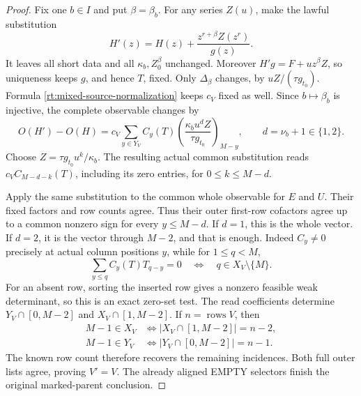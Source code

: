 \documentclass[11pt,a4paper]{amsart}
\numberwithin{equation}{section}
\theoremstyle{plain}
\theoremstyle{definition}
\begin{document}
\begin{proof}
Fix one \(b\in I\) and put \(\beta=\beta_b\).  For any series \(Z(u)\),
make the lawful substitution
\[
 H'(z)=H(z)+\frac{z^{r+\beta}Z(z^r)}{g(z)}.
\]
It leaves all short data and all \(\kappa_b,Z^\beta_0\) unchanged.
Moreover \(H'g=F+uz^\beta Z\), so uniqueness keeps \(g\), and hence
\(T\), fixed.  Only \(\Delta_\beta\) changes, by
\(uZ/(\tau g_{t_0})\).  Formula
\eqref{rt:mixed-source-normalization} keeps \(c_V\) fixed as well.
Since \(b\mapsto\beta_b\) is injective, the complete observable changes
by
\[
 O(H')-O(H)
 =c_V\sum_{y\in Y_V}C_y(T)
       \left(\frac{\kappa_bu^dZ}{\tau g_{t_0}}\right)_{M-y},
 \qquad d=\nu_b+1\in\{1,2\}.
\]
Choose \(Z=\tau g_{t_0}u^k/\kappa_b\).  The resulting actual common
substitution reads \(c_VC_{M-d-k}(T)\), including its zero entries,
for \(0\le k\le M-d\).

Apply the same substitution to the common whole observable for
\(E\) and \(U\).  Their fixed factors and row counts agree.  Thus their
outer first-row cofactors agree up to a common nonzero sign for
every \(y\le M-d\).  If \(d=1\), this is the whole vector.
If \(d=2\), it is the vector through \(M-2\), and that is enough.
Indeed \(C_y\ne0\) precisely at actual column positions \(y\), while
for \(1\le q<M\),
\[
 \sum_{y\le q}C_y(T)T_{q-y}=0
       \quad\Longleftrightarrow\quad q\in X_V\setminus\{M\}.
\]
For an absent row, sorting the inserted row gives a nonzero feasible
weak determinant, so this is an exact zero-set test.  The read
coefficients determine \(Y_V\cap[0,M-2]\) and
\(X_V\cap[1,M-2]\).  If \(n=\operatorname{rows}V\), then
\[
 \begin{split}
 M-1\in X_V&\iff
       |X_V\cap[1,M-2]|=n-2,\\
 M-1\in Y_V&\iff
       |Y_V\cap[0,M-2]|=n-1.
 \end{split}
\]
The known row count therefore recovers the remaining incidences.
Both full outer lists agree, proving \(V'=V\).  The already aligned
EMPTY selectors finish the original marked-parent conclusion.
\end{proof}
\end{document}
